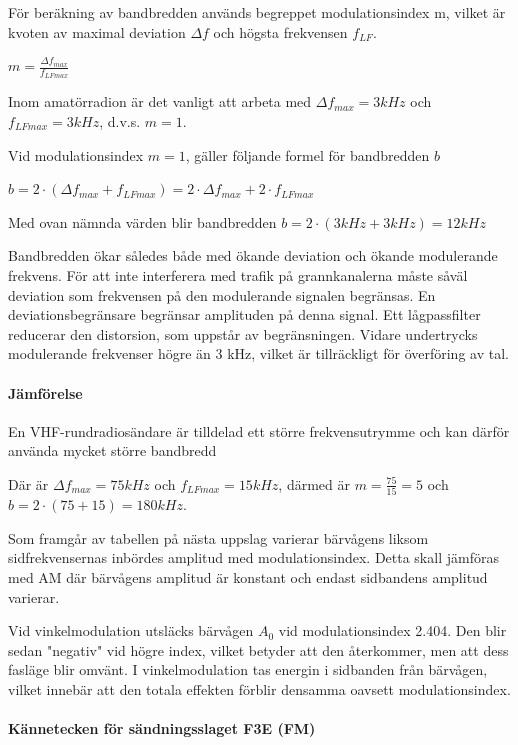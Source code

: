 För beräkning av bandbredden används begreppet modulationsindex m, vilket är
kvoten av maximal deviation \(\Delta f\) och högsta frekvensen \(f_{LF}\).

\(m = \frac{\Delta f_{max}}{f_{LFmax}}\)

Inom amatörradion är det vanligt att arbeta med \(\Delta f_{max} = 3 kHz\) och
\(f_{LFmax} = 3 kHz\), d.v.s. \(m = 1\).

Vid modulationsindex \(m = 1\), gäller följande
formel för bandbredden \(b\)

\(b = 2 \cdot ( \Delta f_{max} + f_{LFmax}) = 2 \cdot \Delta f_{max}
 + 2 \cdot f_{LFmax}\)

Med ovan nämnda värden blir bandbredden \(b = 2 \cdot (3 kHz + 3 kHz)
 = 12 kHz\)

Bandbredden ökar således både med ökande deviation och ökande modulerande
frekvens. För att inte interferera med trafik på grannkanalerna måste såväl
deviation som frekvensen på den modulerande signalen begränsas. En
deviationsbegränsare begränsar amplituden på denna signal. Ett lågpassfilter
reducerar den distorsion, som uppstår av begränsningen. Vidare undertrycks
modulerande frekvenser högre än 3 kHz, vilket är tillräckligt för överföring
av tal.

\paragraph{Jämförelse}

En VHF-rundradiosändare är tilldelad ett större frekvensutrymme och kan därför
använda mycket större bandbredd

Där är \(\Delta f_{max} = 75 kHz\) och \(f_{LFmax} =15 kHz\), därmed är
\(m = \frac{75}{15} = 5\) och \(b = 2 \cdot (75 + 15) = 180 kHz\).

Som framgår av tabellen på nästa uppslag varierar bärvågens liksom
sidfrekvensernas inbördes amplitud med modulationsindex. Detta skall jämföras
med AM där bärvågens amplitud är konstant och endast sidbandens amplitud
varierar.

Vid vinkelmodulation utsläcks bärvågen \(A_0\) vid modulationsindex 2.404. Den
blir sedan "negativ" vid högre index, vilket betyder att den återkommer, men
att dess fasläge blir omvänt. I vinkelmodulation tas energin i sidbanden från
bärvågen, vilket innebär att den totala effekten förblir densamma oavsett
modulationsindex.

\paragraph{Kännetecken för sändningsslaget F3E (FM)}

